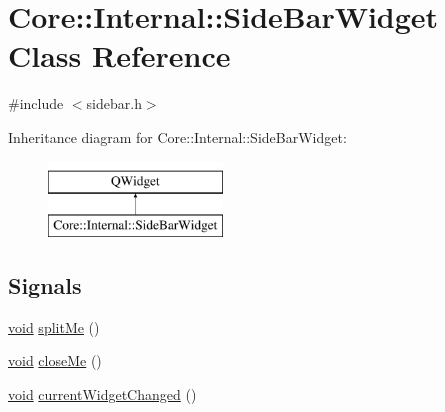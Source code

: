 \hypertarget{class_core_1_1_internal_1_1_side_bar_widget}{\section{Core\-:\-:Internal\-:\-:Side\-Bar\-Widget Class Reference}
\label{class_core_1_1_internal_1_1_side_bar_widget}
}


{\ttfamily \#include $<$sidebar.\-h$>$}

Inheritance diagram for Core\-:\-:Internal\-:\-:Side\-Bar\-Widget\-:\begin{figure}[H]
\begin{center}
\leavevmode
\includegraphics[height=2.000000cm]{class_core_1_1_internal_1_1_side_bar_widget}
\end{center}
\end{figure}
\subsection*{Signals}
\begin{DoxyCompactItemize}
\item 
\hyperlink{group___u_a_v_objects_plugin_ga444cf2ff3f0ecbe028adce838d373f5c}{void} \hyperlink{group___core_plugin_ga0254fa3f1c629d33aed5e8c989463158}{split\-Me} ()
\item 
\hyperlink{group___u_a_v_objects_plugin_ga444cf2ff3f0ecbe028adce838d373f5c}{void} \hyperlink{group___core_plugin_ga51339bee6cb7c6970cf94c1ed2a4148c}{close\-Me} ()
\item 
\hyperlink{group___u_a_v_objects_plugin_ga444cf2ff3f0ecbe028adce838d373f5c}{void} \hyperlink{group___core_plugin_ga0a5688916a02e0e519306197f4c84fed}{current\-Widget\-Changed} ()
\end{DoxyCompactItemize}
